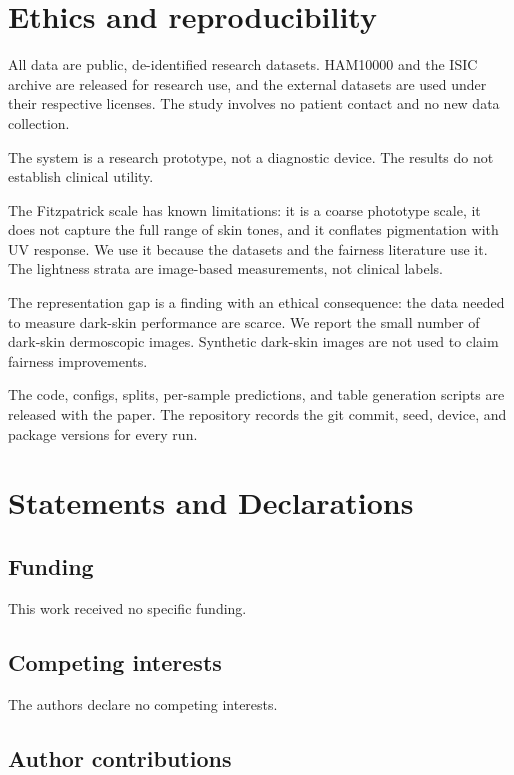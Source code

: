 \documentclass[11pt]{article}
\begin{document}
\section{Ethics and reproducibility}

All data are public, de-identified research datasets. HAM10000 and the ISIC archive are released for research use, and the external datasets are used under their respective licenses. The study involves no patient contact and no new data collection.

The system is a research prototype, not a diagnostic device. The results do not establish clinical utility.

The Fitzpatrick scale has known limitations: it is a coarse phototype scale, it does not capture the full range of skin tones, and it conflates pigmentation with UV response. We use it because the datasets and the fairness literature use it. The lightness strata are image-based measurements, not clinical labels.

The representation gap is a finding with an ethical consequence: the data needed to measure dark-skin performance are scarce. We report the small number of dark-skin dermoscopic images. Synthetic dark-skin images are not used to claim fairness improvements.

The code, configs, splits, per-sample predictions, and table generation scripts are released with the paper. The repository records the git commit, seed, device, and package versions for every run.

\section*{Statements and Declarations}

\subsection*{Funding}

This work received no specific funding.

\subsection*{Competing interests}

The authors declare no competing interests.

\ifdefined\blindmode
\subsection*{Author contributions}
\end{document}
